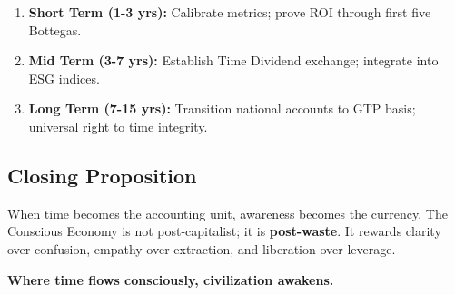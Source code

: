 \begin{enumerate}
    \item \textbf{Short Term (1-3 yrs):} Calibrate metrics; prove ROI through first five Bottegas.
    \item \textbf{Mid Term (3-7 yrs):} Establish Time Dividend exchange; integrate into ESG indices.
    \item \textbf{Long Term (7-15 yrs):} Transition national accounts to GTP basis; universal right to time integrity.
\end{enumerate}

\subsection{Closing Proposition}
\label{sec:markets-closing}

When time becomes the accounting unit, awareness becomes the currency. The Conscious Economy is not post-capitalist; it is \textbf{post-waste}. It rewards clarity over confusion, empathy over extraction, and liberation over leverage.

\begin{keyproposition}
\textbf{Where time flows consciously, civilization awakens.}
\end{keyproposition}

